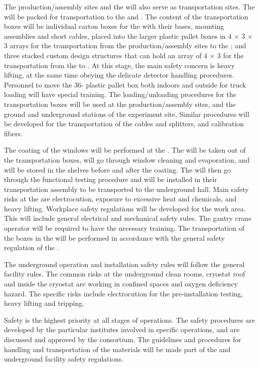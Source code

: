 The production/assembly sites and the  will also serve as transportation sites. The  will be packed for transportation to the  and \surf. The content of the transportation boxes will be individual carton boxes for the  with their bases, mounting assemblies and short cables, placed into the larger plastic pallet boxes in \num{4} $\times$ \num{3} $\times$ \num{3} arrays for the transportation from the production/assembly sites to the ; and three stacked custom design structures that can hold an array of \num{4} $\times$ \num{3}  for the transportation from the  to \surf. At this stage, the main safety concern is heavy lifting, at the same time obeying the delicate detector handling procedures. Personnel to move the \num{36}- plastic pallet box both indoors and outside for truck loading will have special training. The loading/unloading procedures for the  transportation boxes will be used at the production/assembly sites,  and the ground and underground stations of the experiment site. Similar procedures will be developed for the transportation of the  cables and splitters, and calibration fibers.

The  coating of the  windows will be performed at the . The  will be taken out of the transportation boxes, will go through window cleaning and  evaporation, and will be stored in the shelves before and after the coating. The  will then go through the functional testing procedure and will be installed in their transportation assembly to be transported to the underground hall. Main safety risks at the  are electrocution, exposure to excessive heat and chemicals, and heavy lifting. Workplace safety regulations will be developed for the  \dual {} work area. This will include general electrical and mechanical safety rules. The gantry crane operator will be required to have the necessary training. The transportation of the  boxes in the  will be performed in accordance with the general safety regulation of the .

The underground operation and installation safety rules will follow the general facility rules. The common risks at the underground clean rooms, cryostat roof and inside the cryostat are working in confined spaces and oxygen deficiency hazard. The \dual {} specific risks include electrocution for the pre-installation testing, heavy lifting and tripping.

Safety is the highest priority at all stages of \dual {} operations. The safety procedures are developed by the particular institutes involved in specific operations, and are discussed and approved by the consortium. The guidelines and procedures for handling and transportation of the \dual {} materials will be made part of the  and underground facility safety regulations.








